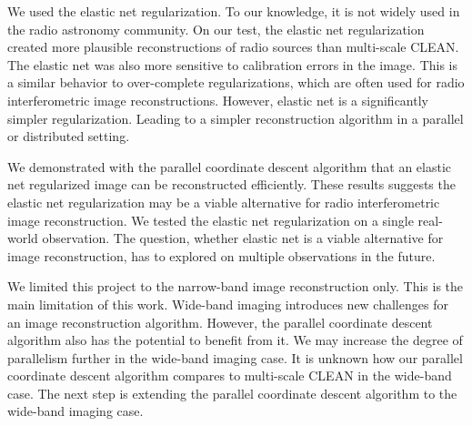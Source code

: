 
We used the elastic net regularization. To our knowledge, it is not widely used in the radio astronomy community. On our test, the elastic net regularization created more plausible reconstructions of radio sources than multi-scale CLEAN. The elastic net was also more sensitive to calibration errors in the image. This is a similar behavior to over-complete regularizations, which are often used for radio interferometric image reconstructions. However, elastic net is a significantly simpler regularization. Leading to a simpler reconstruction algorithm in a parallel or distributed setting. 

We demonstrated with the parallel coordinate descent algorithm that an elastic net regularized image can be reconstructed efficiently. These results suggests the elastic net regularization may be a viable alternative for radio interferometric image reconstruction. We tested the elastic net regularization on a single real-world observation. The question, whether elastic net is a viable alternative for image reconstruction, has to explored on multiple observations in the future.

We limited this project to the narrow-band image reconstruction only. This is the main limitation of this work. Wide-band imaging introduces new challenges for an image reconstruction algorithm. However, the parallel coordinate descent algorithm also has the potential to benefit from it. We may increase the degree of parallelism further in the wide-band imaging case. It is unknown how our parallel coordinate descent algorithm compares to multi-scale CLEAN in the wide-band case. The next step is extending the parallel coordinate descent algorithm to the wide-band imaging case.
